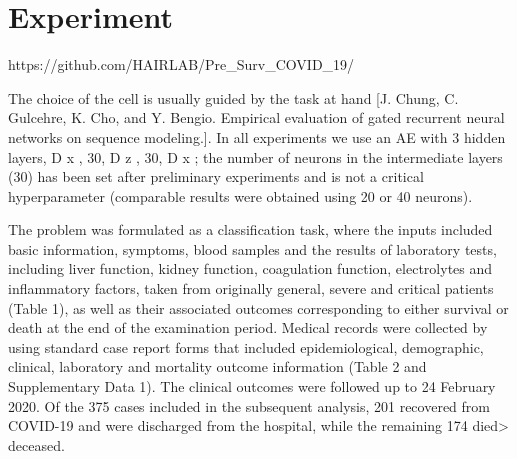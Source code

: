 \section{Experiment}
\iffalse
https://github.com/HAIRLAB/Pre_Surv_COVID_19/

The choice of the cell is usually guided by the task at hand [J. Chung, C. Gulcehre, K. Cho, and Y. Bengio. Empirical evaluation of gated recurrent neural networks on sequence modeling.].
In all experiments we use an AE with 3 hidden layers, { D x , 30, D z , 30, D x } ; the number of neurons in the intermediate layers (30) has been set after preliminary experiments and is not a critical hyperparameter (comparable results were obtained using 20 or 40 neurons).

The problem was formulated as a classification task, where the inputs included basic information, symptoms, blood samples and the results of laboratory tests, including liver function, kidney function, coagulation function, electrolytes and inflammatory factors, taken from originally general, severe and critical patients (Table 1), as well as their associated outcomes corresponding to either survival or death at the end of the examination period. 
Medical records were collected by using standard case report forms that included epidemiological, demographic, clinical, laboratory and mortality outcome information (Table 2 and Supplementary Data 1).
The clinical outcomes were followed up to 24 February 2020.
Of the 375 cases included in the subsequent analysis, 201 recovered from COVID-19 and were discharged from the hospital, while the remaining 174 died> deceased.

